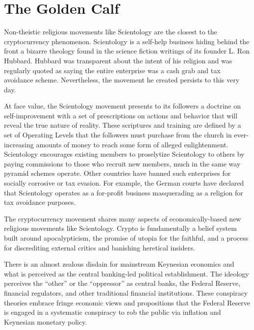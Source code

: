 
\section{The Golden Calf}

Non-theistic religious movements like Scientology are the closest to the
cryptocurrency phenomenon. Scientology is a self-help business hiding behind the
front a bizarre theology found in the science fiction writings of its founder L.
Ron Hubbard. Hubbard was transparent about the intent of his religion and was
regularly quoted as saying the entire enterprise was a cash grab and tax
avoidance scheme. Nevertheless, the movement he created persists to this very
day.

At face value, the Scientology movement presents to its followers a doctrine on
self-improvement with a set of prescriptions on actions and behavior that will
reveal the true nature of reality. These scriptures and training are defined by
a set of Operating Levels that the followers must purchase from the church in
ever-increasing amounts of money to reach some form of alleged enlightenment.
Scientology encourages existing members to proselytize Scientology to others by
paying commissions to those who recruit new members, much in the same way
pyramid schemes operate. Other countries have banned such enterprises for
socially corrosive or tax evasion. For example, the German courts have declared
that Scientology operates as a for-profit business masquerading as a religion
for tax avoidance purposes.


The cryptocurrency movement shares many aspects of economically-based new
religious movements like Scientology. Crypto is fundamentally a belief system
built around apocalypticism, the promise of utopia for the faithful, and a
process for discrediting external critics and banishing heretical insiders.
\cite{venkataramakrishnan_inside_2021}

There is an almost zealous disdain for mainstream Keynesian economics and what
is perceived as the central banking-led political establishment. The ideology
perceives the ``other'' or the ``oppressor'' as central banks, the Federal
Reserve, financial regulators, and other traditional financial institutions.
These conspiracy theories embrace fringe economic views and propositions that
the Federal Reserve is engaged in a systematic conspiracy to rob the public via
inflation and Keynesian monetary policy.

